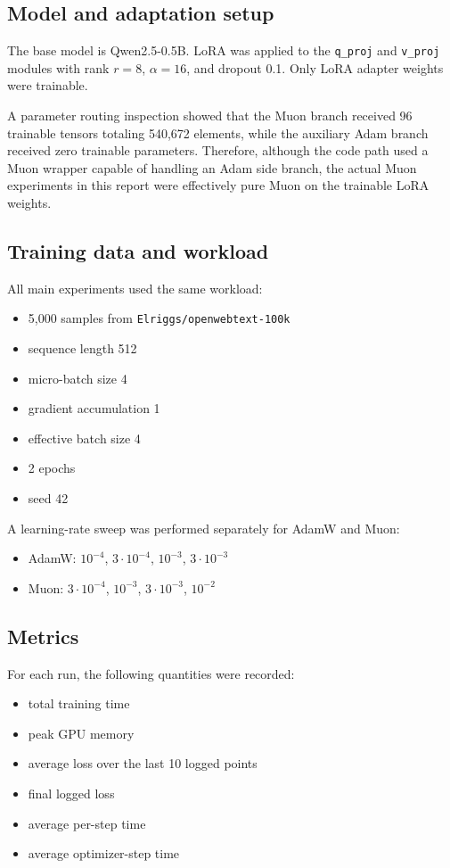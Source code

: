 \documentclass[11pt]{article}
\begin{document}
\subsection{Model and adaptation setup}
The base model is Qwen2.5-0.5B.
LoRA was applied to the \texttt{q\_proj} and \texttt{v\_proj} modules with rank $r=8$, $\alpha=16$, and dropout 0.1.
Only LoRA adapter weights were trainable.

A parameter routing inspection showed that the Muon branch received 96 trainable tensors totaling 540,672 elements, while the auxiliary Adam branch received zero trainable parameters.
Therefore, although the code path used a Muon wrapper capable of handling an Adam side branch, the actual Muon experiments in this report were effectively pure Muon on the trainable LoRA weights.

\subsection{Training data and workload}
All main experiments used the same workload:
\begin{itemize}[leftmargin=1.5em]
    \item 5,000 samples from \texttt{Elriggs/openwebtext-100k}
    \item sequence length 512
    \item micro-batch size 4
    \item gradient accumulation 1
    \item effective batch size 4
    \item 2 epochs
    \item seed 42
\end{itemize}

A learning-rate sweep was performed separately for AdamW and Muon:
\begin{itemize}[leftmargin=1.5em]
    \item AdamW: $10^{-4}$, $3 \cdot 10^{-4}$, $10^{-3}$, $3 \cdot 10^{-3}$
    \item Muon: $3 \cdot 10^{-4}$, $10^{-3}$, $3 \cdot 10^{-3}$, $10^{-2}$
\end{itemize}

\subsection{Metrics}
For each run, the following quantities were recorded:
\begin{itemize}[leftmargin=1.5em]
    \item total training time
    \item peak GPU memory
    \item average loss over the last 10 logged points
    \item final logged loss
    \item average per-step time
    \item average optimizer-step time
\end{itemize}
\end{document}
